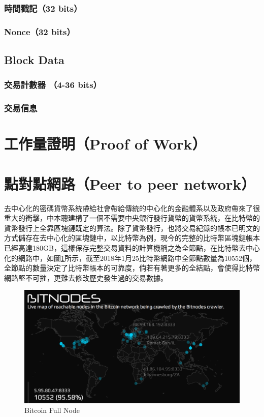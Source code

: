 			\subsubsection{時間戳記（32 bits）}
			\subsubsection{Nonce（32 bits）}

		\subsection{Block Data}
			\subsubsection{交易計數器 （4-36 bits）}
			\subsubsection{交易信息}

	\section{工作量證明（Proof of Work）}
	\section{點對點網路（Peer to peer network）}

	去中心化的密碼貨幣系統帶給社會帶給傳統的中心化的金融體系以及政府帶來了很重大的衝擊，中本聰建構了一個不需要中央銀行發行貨幣的貨幣系統，在比特幣的貨幣發行上全靠區塊鏈既定的算法。除了貨幣發行，也將交易紀錄的帳本已明文的方式儲存在去中心化的區塊鏈中，以比特幣為例，現今的完整的比特幣區塊鏈帳本已經高達180GB，這樣保存完整交易資料的計算機稱之為全節點，在比特幣去中心化的網路中，如圖\ref{bitcoinfullnode}所示，截至2018年1月25比特幣網路中全節點數量為10552個\parencite{bitcoinfullnode}，全節點的數量決定了比特幣帳本的可靠度，倘若有著更多的全結點，會使得比特幣網路堅不可摧，更難去修改歷史發生過的交易數據。

	\begin{figure}
		\centering
		\includegraphics[width = .9\textwidth]{bitcoinfullnode.png}
		\caption{Bitcoin Full Node\parencite{bitcoinfullnode}}\label{bitcoinfullnode}
	\end{figure}

